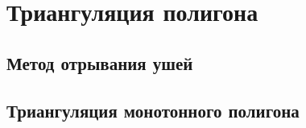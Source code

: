 \section{Триангуляция полигона}
\subsection{Метод отрывания ушей}
\subsection{Триангуляция монотонного полигона}

